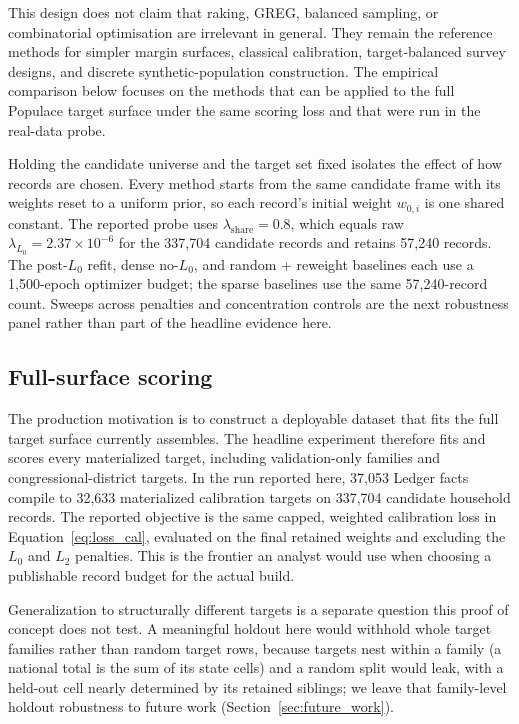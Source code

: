 This design does not claim that raking, GREG, balanced sampling, or combinatorial optimisation are
irrelevant in general. They remain the reference methods for simpler margin surfaces, classical
calibration, target-balanced survey designs, and discrete synthetic-population construction. The
empirical comparison below focuses on the methods that can be applied to the full Populace target
surface under the same scoring loss and that were run in the real-data probe.

Holding the candidate universe and the target set fixed isolates the effect of how records are
chosen. Every method starts from the same candidate frame with its weights reset to a uniform prior, so
each record's initial weight $w_{0,i}$ is one shared constant. The reported probe uses
$\lambda_{\mathrm{share}}=0.8$, which equals raw $\lambda_{L_0}=2.37\times10^{-6}$ for the 337{,}704
candidate records and retains 57{,}240 records. The post-$L_0$ refit, dense no-$L_0$, and random +
reweight baselines each use a 1{,}500-epoch optimizer budget; the sparse baselines use the same
57{,}240-record count. Sweeps across penalties and concentration controls are the next
robustness panel rather than part of the headline evidence here.

\subsection{Full-surface scoring}
\label{sec:oos}

The production motivation is to construct a deployable dataset that fits the full target surface 
\populace{} currently assembles. The headline experiment therefore fits and scores every materialized 
target, including validation-only families and congressional-district targets. In the run reported here, 
37{,}053 Ledger facts compile to 32{,}633 materialized calibration targets on 337{,}704 candidate 
household records. The reported objective is the same capped, weighted calibration loss in 
Equation~\ref{eq:loss_cal}, evaluated on the final retained weights and excluding the $L_0$ and $L_2$ 
penalties. This is the frontier an analyst would use when choosing a publishable record budget for 
the actual \populace{} build.

Generalization to structurally different targets is a separate question this proof of concept does not
test. A meaningful holdout here would withhold whole target families rather than random target rows,
because targets nest within a family (a national total is the sum of its state cells) and a random split
would leak, with a held-out cell nearly determined by its retained siblings; we leave that family-level
holdout robustness to future work (Section~\ref{sec:future_work}).

